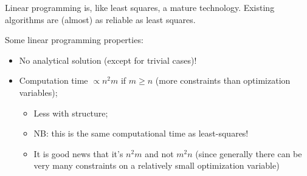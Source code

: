 Linear programming is, like least squares, a mature technology. Existing algorithms are (almost) as reliable as least squares.

\begin{Fact}
	Some linear programming properties:
	
	\begin{itemize}
		\item No analytical solution (except for trivial cases)!
		\item Computation time $\propto n^2m$ if $m\ge n$ (more constraints than optimization variables);
		\begin{itemize}
			\item Less with structure;
			\item NB: this is the same computational time as least-squares!
			\item It is good news that it's $n^2m$ and not $m^2n$ (since generally there can be very many constraints on a relatively small optimization variable)
		\end{itemize}
	\end{itemize}
\end{Fact}






